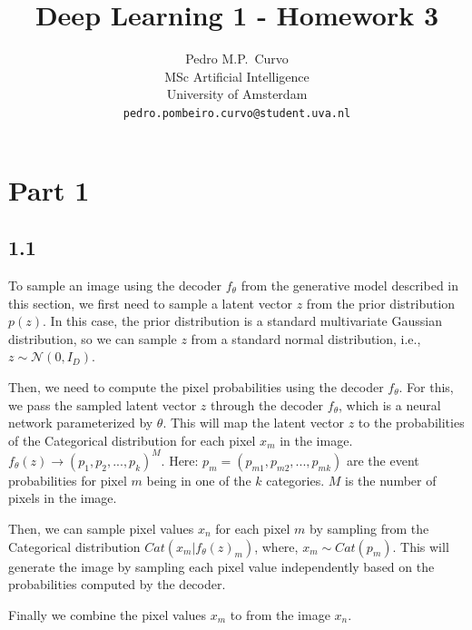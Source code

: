\documentclass{article}
\title{Deep Learning 1 - Homework 3}
\author{%
  Pedro M.P.~Curvo \\
  MSc Artificial Intelligence\\
  University of Amsterdam\\
  \texttt{pedro.pombeiro.curvo@student.uva.nl} \\
}
\begin{document}
\maketitle




\section*{Part 1}

\subsection*{1.1}

To sample an image using the decoder $f_{\theta}$ from the generative model described in this section, we first
need to sample a latent vector $z$ from the prior distribution $p(z)$. In this case, the prior distribution is a
standard multivariate Gaussian distribution, so we can sample $z$ from a standard normal distribution, i.e., $z \sim \mathcal{N}(0, I_D)$.

Then, we need to compute the pixel probabilities using the decoder $f_{\theta}$. For this, we pass
the sampled latent vector $z$ through the decoder $f_{\theta}$, which is a neural network parameterized by $\theta$.
This will map the latent vector $z$ to the probabilities of the Categorical distribution for each pixel $x_m$ in the image.
$f_{\theta}(z) \rightarrow (p_1, p_2, ..., p_k)^M$. 
Here: $p_m = (p_{m1}, p_{m2}, ..., p_{mk})$ are the event probabilities for pixel $m$ being in one of the $k$ categories. $M$ is the number of pixels in the image. 

Then, we can sample pixel values $x_n$ for each pixel $m$ by sampling from the Categorical distribution $Cat(x_m | f_{\theta}(z)_m)$, where, $x_m \sim Cat(p_m)$. This will generate the image by sampling each pixel value independently based on the probabilities computed by the decoder. 

Finally we combine the pixel values $x_m$ to from the image $x_n$. 
\end{document}
